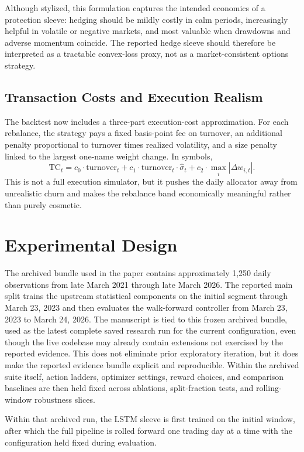 \documentclass[11pt]{article}
\begin{document}
Although stylized, this formulation captures the intended economics of a
protection sleeve: hedging should be mildly costly in calm periods, increasingly
helpful in volatile or negative markets, and most valuable when drawdowns and
adverse momentum coincide.
The reported hedge sleeve should therefore be interpreted as a tractable
convex-loss proxy, not as a market-consistent options strategy.

\subsection{Transaction Costs and Execution Realism}

The backtest now includes a three-part execution-cost approximation. For each
rebalance, the strategy pays a fixed basis-point fee on turnover, an additional
penalty proportional to turnover times realized volatility, and a size penalty
linked to the largest one-name weight change. In symbols,
\[
\mathrm{TC}_t
= c_0 \cdot \mathrm{turnover}_t
+ c_1 \cdot \mathrm{turnover}_t \cdot \hat{\sigma}_t
+ c_2 \cdot \max_i |\Delta w_{i,t}|.
\]
This is not a full execution simulator, but it pushes the daily allocator away
from unrealistic churn and makes the rebalance band economically meaningful
rather than purely cosmetic.

\section{Experimental Design}

The archived bundle used in the paper contains approximately 1{,}250 daily
observations from late March 2021 through late March 2026. The reported main
split trains the upstream statistical components on the initial segment through
March 23, 2023 and then evaluates the walk-forward controller from March 23,
2023 to March 24, 2026. The manuscript is tied to this frozen archived bundle,
used as the latest complete saved research run for the current configuration,
even though the live codebase may already contain extensions not exercised by
the reported evidence. This does not eliminate prior exploratory iteration, but
it does make the reported evidence bundle explicit and reproducible.
Within the archived suite itself, action ladders, optimizer settings, reward
choices, and comparison baselines are then held fixed across ablations,
split-fraction tests, and rolling-window robustness slices.

Within that archived run, the LSTM sleeve is first trained on the initial
window, after which the full pipeline is rolled forward one trading day at a
time with the configuration held fixed during evaluation.
\end{document}
